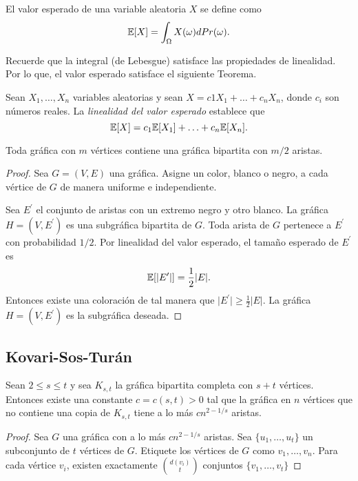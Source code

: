 \begin{definition}
El valor esperado de una variable aleatoria $X$ se define como
$$\mathbb{E}[X] = \int_{\Omega} X(\omega) d Pr(\omega).$$
\end{definition}

Recuerde que la integral (de Lebesgue) satisface las propiedades de
linealidad. Por lo que, el valor esperado satisface el siguiente Teorema.

\begin{theorem}
Sean $X_1, \ldots, X_n$ variables aleatorias y sean $X = c1 X_1 +
\ldots + c_n X_n$, donde $c_i$ son números reales. La
\textit{linealidad del valor esperado} establece que
$$ \mathbb{E}[X] = c_1 \mathbb{E}[X_1] + \ldots + c_n \mathbb{E}[X_n]. $$
\end{theorem}

\begin{theorem}
Toda gráfica con $m$ vértices contiene una gráfica bipartita con $m
/ 2$ aristas.
\end{theorem}
\begin{proof}
Sea $G = (V, E)$ una gráfica. Asigne un color, blanco o negro, a
cada vértice de $G$  de manera uniforme e independiente.

Sea $E^\prime$ el conjunto de aristas con un extremo negro y otro
blanco. La gráfica $H = (V, E^\prime)$ es una subgráfica bipartita de $G$.
Toda arista de $G$ pertenece a $E^\prime$ con probabilidad $1/2$.
Por linealidad del valor esperado, el tamaño esperado de $E^\prime$ es
$$\mathbb{E}[\vert E^\prime \vert] = \frac{1}{2} \vert E \vert.$$
Entonces existe una coloración de tal manera que $\vert E^\prime
\vert \ge \frac{1}{2}\vert E \vert$. La gráfica $H = (V, E^\prime)$
es la subgráfica deseada.
\end{proof}

%

\subsection{Kovari-Sos-Turán}
\begin{theorem}
Sean $2 \leq s \leq t$ y sea $K_{s,t}$ la gráfica bipartita
completa con $s + t$ vértices. Entonces existe una constante $c =
c(s, t) > 0$ tal que
la gráfica en $n$ vértices que no contiene una copia de $K_{s, t}$
tiene a lo más
$c n^{2 - 1/s}$ aristas.
\end{theorem}
\begin{proof}
Sea $G$ una gráfica con a lo más $cn^{2 - 1/s}$ aristas.
Sea $\{u_1, \ldots, u_t\}$ un subconjunto de $t$ vértices de $G$.
Etiquete los vértices de $G$ como $v_1, \ldots, v_n$. Para cada vértice
$v_i$, existen exactamente $\binom{d(v_i)}{t}$ conjuntos $\{v_1,
\ldots, v_t\}$
\end{proof}

